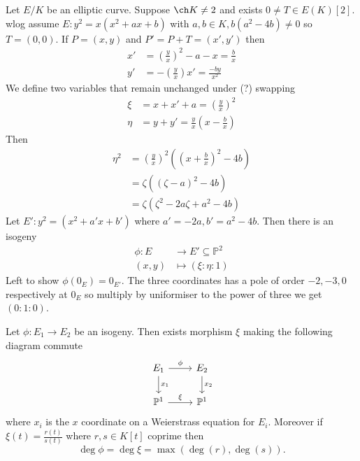 \documentclass[a4paper]{article}
\theoremstyle{definition}
\renewcommand*{\P}{\mathbb{P}}
\begin{document}
\begin{eg}
  Let \(E/K\) be an elliptic curve. Suppose \(\ch K \neq 2\) and exists \(0 \neq T \in E(K)[2]\). wlog assume \(E: y^2 = x(x^2 + ax + b)\) with \(a, b \in K, b(a^2 - 4b) \neq 0\) so \(T = (0, 0)\). If \(P = (x, y)\) and \(P' = P + T = (x', y')\) then
  \begin{align*}
    x' &= \left( \frac{y}{x} \right)^2 - a - x = \frac{b}{x} \\
    y' &= - \left( \frac{y}{x} \right) x' = \frac{-by}{x^2}
  \end{align*}
  We define two variables that remain unchanged under (?) swapping
  \begin{align*}
    \xi &= x + x' + a = \left( \frac{y}{x} \right)^2 \\
    \eta &= y + y' = \frac{y}{x} (x - \frac{b}{x})
  \end{align*}
  Then
  \begin{align*}
    \eta^2 &= \left( \frac{y}{x} \right)^2 ((x + \frac{b}{x})^2 - 4b) \\
           &= \zeta ((\zeta - a)^2 - 4b) \\
           &= \zeta (\zeta^2 - 2a\zeta + a^2 - 4b)
  \end{align*}
  Let \(E': y^2 = (x^2 + a'x + b')\) where \(a' = -2a, b' = a^2 - 4b\). Then there is an isogeny
  \begin{align*}
    \phi: E &\to E' \subseteq \P^2 \\
    (x, y) &\mapsto (\xi : \eta : 1)
  \end{align*}
  Left to show \(\phi(0_E) = 0_{E'}\). The three coordinates has a pole of order \(-2, -3, 0\) respectively at \(0_E\) so multiply by uniformiser to the power of three we get \((0:1:0)\).
\end{eg}

\begin{lemma}
  Let \(\phi: E_1 \to E_2\) be an isogeny. Then exists morphism \(\xi\) making the following diagram commute
  \[
    \begin{tikzcd}
      E_1 \ar[r, "\phi"] \ar[d, "x_1"] & E_2 \ar[d, "x_2"] \\
      \P^1 \ar[r, "\xi"] & \P^1
    \end{tikzcd}
  \]
  where \(x_i\) is the \(x\) coordinate on a Weierstrass equation for \(E_i\). Moreover if \(\xi(t) = \frac{r(t)}{s(t)}\) where \(r, s \in K[t]\) coprime then
  \[
    \deg \phi = \deg \xi = \max (\deg (r), \deg (s)).
  \]
\end{lemma}
\end{document}

